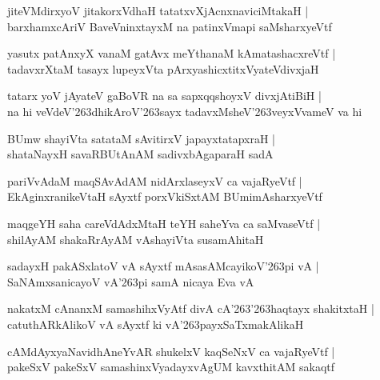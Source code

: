 \documentclass[twoside,12pt,openright]{book}
\def\S{\char'263}
\newcounter{shloka}[chapter]
\begin{document}
\begin{shloka}
jiteVMdirxyoV jitakorxVdhaH tatatxvXjAcnxnaviciMtakaH |\\
barxhamxcAriV BaveVninxtayxM na patinxVmapi saMsharxyeVtf 
\end{shloka}

\begin{shloka}
yasutx patAnxyX vanaM gatAvx meYthanaM kAmatashacxreVtf |\\
tadavxrXtaM tasayx lupeyxVta pArxyashicxtitxVyateVdivxjaH 
\end{shloka}

\begin{shloka}
tatarx yoV jAyateV gaBoVR na sa sapxqqshoyxV divxjAtiBiH |\\
na hi veVdeV\S dhikAroV\S sayx tadavxMsheV\S veyxVvameV va hi 
\end{shloka}

\begin{shloka}
BUmw shayiVta satataM sAvitirxV japayxtatapxraH |\\
shataNayxH savaRBUtAnAM sadivxbAgaparaH sadA 
\end{shloka}

\begin{shloka}
pariVvAdaM maqSAvAdAM nidArxlaseyxV ca vajaRyeVtf |\\
EkAginxranikeVtaH sAyxtf porxVkiSxtAM BUmimAsharxyeVtf 
\end{shloka}

\begin{shloka}
maqgeYH saha careVdAdxMtaH teYH saheYva ca saMvaseVtf |\\
shilAyAM shakaRrAyAM vAshayiVta susamAhitaH 
\end{shloka}

\begin{shloka}
sadayxH pakASxlatoV vA sAyxtf mAsasAMcayikoV\S pi vA |\\
SaNAmxsanicayoV vA\S pi samA nicaya Eva vA 
\end{shloka}

\begin{shloka}
nakatxM cAnanxM samashihxVyAtf divA cA\S\S haqtayx shakitxtaH |\\
catuthARkAlikoV vA sAyxtf ki vA\S payxSaTxmakAlikaH 
\end{shloka}

\begin{shloka}
cAMdAyxyaNavidhAneYvAR shukelxV kaqSeNxV ca vajaRyeVtf |\\
pakeSxV pakeSxV samashinxVyadayxvAgUM kavxthitAM sakaqtf 
\end{shloka}
\end{document}
